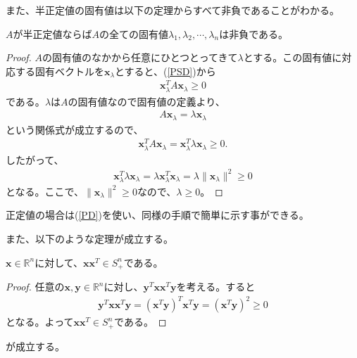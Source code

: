 また、半正定値の固有値は以下の定理からすべて非負であることがわかる。
\begin{theorem}
  $A$が半正定値ならば$A$の全ての固有値$\lambda_1, \lambda_2, \cdots, \lambda_n$は非負である。
\end{theorem}
\begin{proof}
  $A$の固有値のなかから任意にひとつとってきて$\lambda$とする。この固有値に対応する固有ベクトルを$\mathbf{x}_\lambda$とすると、(\ref{PSD})から
  \begin{align*}
    \mathbf{x}_\lambda^T A \mathbf{x}_\lambda \geq 0
  \end{align*}
  である。$\lambda$は$A$の固有値なので固有値の定義より、
  \begin{align*}
    A \mathbf{x}_\lambda = \lambda \mathbf{x}_\lambda
  \end{align*}
  という関係式が成立するので、
  \begin{align*}
    \mathbf{x}_\lambda^T A \mathbf{x}_\lambda = \mathbf{x}_\lambda^T \lambda \mathbf{x}_\lambda \geq 0.
  \end{align*}
  したがって、
  \begin{align*}
    \mathbf{x}_\lambda^T \lambda \mathbf{x}_\lambda = \lambda \mathbf{x}_\lambda^T \mathbf{x}_\lambda = \lambda \|\mathbf{x}_\lambda\|^2 \geq 0
  \end{align*}
  となる。ここで、$\|\mathbf{x}_\lambda\|^2 \geq 0$なので、$\lambda \geq 0$。
\end{proof}
正定値の場合は(\ref{PD})を使い、同様の手順で簡単に示す事ができる。

また、以下のような定理が成立する。
\begin{theorem} \label{PsdMatrix}
  $\mathbf{x} \in \mathbb{R}^n$に対して、$\mathbf{x} \mathbf{x}^T \in S_+^n$である。
\end{theorem}
\begin{proof}
  任意の$\mathbf{x}, \mathbf{y} \in \mathbb{R}^n$に対し、$\mathbf{y}^T \mathbf{x} \mathbf{x}^T \mathbf{y}$を考える。すると
  \begin{align*}
    \mathbf{y}^T \mathbf{x} \mathbf{x}^T \mathbf{y} = \left(\mathbf{x}^T \mathbf{y}\right)^T \mathbf{x}^T \mathbf{y} = \left(\mathbf{x}^T \mathbf{y}\right)^2 \geq 0
  \end{align*}
  となる。よって$\mathbf{x} \mathbf{x}^T \in S_+^n$である。
\end{proof}
が成立する。
